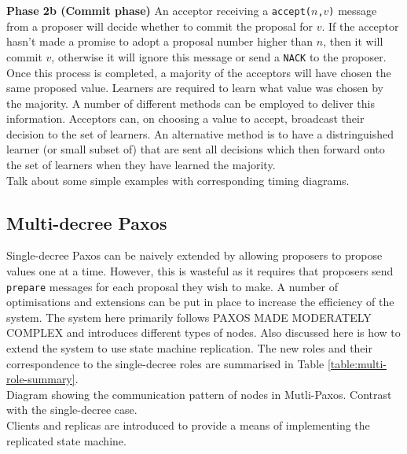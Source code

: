 \textbf{Phase 2b (Commit phase)} An acceptor receiving a \texttt{accept($n$,$v$)} message from a proposer will decide whether to commit the proposal for $v$. If the acceptor hasn't made a promise to adopt a proposal number higher than $n$, then it will commit $v$, otherwise it will ignore this message or send a \texttt{NACK} to the proposer. \\

Once this process is completed, a majority of the acceptors will have chosen the same proposed value. Learners are required to learn what value was chosen by the majority. A number of different methods can be employed to deliver this information. Acceptors can, on choosing a value to accept, broadcast their decision to the set of learners. An alternative method is to have a distringuished learner (or small subset of) that are sent all decisions which then forward onto the set of learners when they have learned the majority. \\

{\color{blue}Talk about some simple examples with corresponding timing diagrams.}




\subsection{Multi-decree Paxos}

Single-decree Paxos can be naively extended by allowing proposers to propose values one at a time. However, this is wasteful as it requires that proposers send \texttt{prepare} messages for each proposal they wish to make. A number of optimisations and extensions can be put in place to increase the efficiency of the system. The system here primarily follows {\color{red}PAXOS MADE MODERATELY COMPLEX} and introduces different types of nodes. {\color{red}Also discussed here is how to extend the system to use state machine replication}. The new roles and their correspondence to the single-decree roles are summarised in Table \ref{table:multi-role-summary}. \\

{\color{blue}Diagram showing the communication pattern of nodes in Mutli-Paxos. Contrast with the single-decree case.} \\

Clients and replicas are introduced to provide a means of implementing the replicated state machine.

